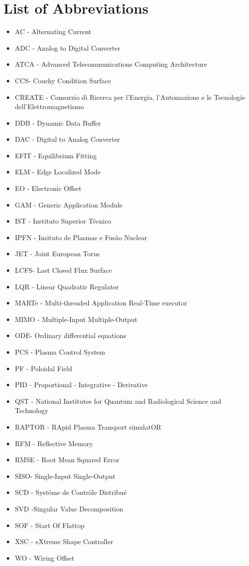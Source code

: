 \chapter*{List of Abbreviations}

\begin{itemize}
\item AC - Alternating Current
\item ADC - Analog to Digital Converter
\item ATCA -  Advanced Telecommunications Computing Architecture 
\item CCS- Couchy Condition Surface 
\item CREATE - Consorzio di Ricerca per l'Energia, l'Automazione e le Tecnologie dell'Elettromagnetismo
\item DDB - Dynamic Data Buffer
\item DAC - Digital to Analog Converter
\item EFIT - Equilibrium Fitting
\item  ELM - Edge Localized Mode
\item EO - Electronic Offset
\item GAM - Generic Application Module 
\item IST - Instituto Superior Técnico
\item IPFN - Insituto de Plasmas e Fus\~ao Nuclear
\item JET - Joint European Torus
\item LCFS- Last Closed Flux Surface
\item LQR - Linear Quadratic Regulator
\item MARTe - Multi-threaded Application Real-Time executor
\item MIMO - Multiple-Input Multiple-Output
\item ODE- Ordinary differential equations
\item PCS - Plasma Control System
\item PF - Poloidal Field 
\item PID - Proportional - Integrative - Derivative
\item QST -  National Institutes for Quantum and Radiological Science and Technology 
\item RAPTOR - RApid Plasma Transport simulatOR
\item RFM - Reflective Memory
\item RMSE - Root Mean Squared Error
\item SISO- Single-Input Single-Output
\item SCD - Syst\'eme de Contr\^ole Distribu\'e
\item  SVD -Singular Value Decomposition
\item SOF - Start Of Flattop
\item XSC - eXtreme Shape Controller
\item WO - Wiring Offset
\end{itemize}


